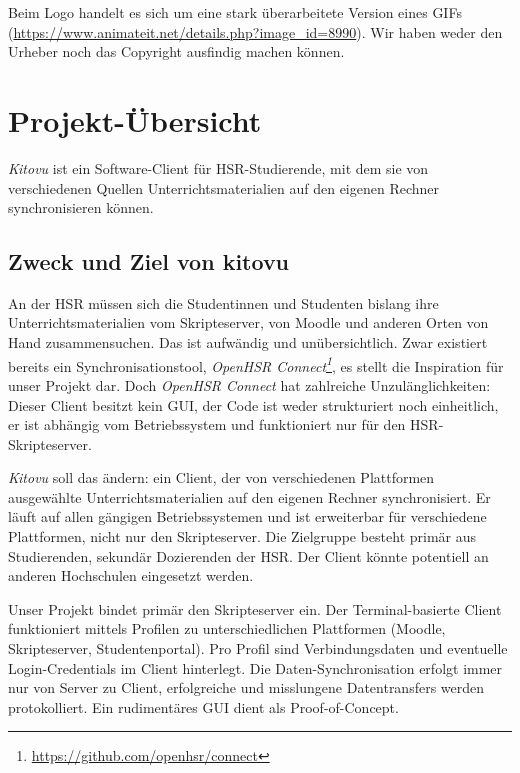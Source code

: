 \documentclass[a4paper]{article}
\let\oldsection\section
\renewcommand\section{\clearpage\oldsection}
\newcommand{\tool}[2]{\emph{#1\footnote{\url{#2}}}}
\begin{document}
Beim Logo handelt es sich um eine stark überarbeitete Version eines GIFs (\url{https://www.animateit.net/details.php?image_id=8990}). Wir haben weder den Urheber noch das Copyright ausfindig machen können.

\section{Projekt-Übersicht}
\emph{Kitovu} ist ein Software-Client für HSR-Studierende, mit dem sie von verschiedenen Quellen Unterrichtsmaterialien auf den eigenen Rechner synchronisieren können.

\subsection{Zweck und Ziel von kitovu}
An der HSR müssen sich die Studentinnen und Studenten bislang ihre Unterrichtsmaterialien vom Skripteserver, von Moodle und anderen Orten von Hand zusammensuchen. Das ist aufwändig und unübersichtlich. Zwar existiert bereits ein Synchronisationstool, \tool{OpenHSR Connect}{https://github.com/openhsr/connect}, es stellt die Inspiration für unser Projekt dar. Doch \emph{OpenHSR Connect} hat zahlreiche Unzulänglichkeiten: Dieser Client besitzt kein GUI, der Code ist weder strukturiert noch einheitlich, er ist abhängig vom Betriebssystem und funktioniert nur für den HSR-Skripteserver.

\emph{Kitovu} soll das ändern: ein Client, der von verschiedenen Plattformen ausgewählte Unterrichtsmaterialien auf den eigenen Rechner synchronisiert. Er läuft auf allen gängigen Betriebssystemen und ist erweiterbar für verschiedene Plattformen, nicht nur den Skripteserver. Die Zielgruppe besteht primär aus Studierenden, sekundär Dozierenden der HSR. Der Client könnte potentiell an anderen Hochschulen eingesetzt werden.

Unser Projekt bindet primär den Skripteserver ein. Der Terminal-basierte Client funktioniert mittels Profilen zu unterschiedlichen Plattformen (Moodle, Skripteserver, Studentenportal). Pro Profil sind Verbindungsdaten und eventuelle Login-Credentials im Client hinterlegt. Die Daten-Synchronisation erfolgt immer nur von Server zu Client, erfolgreiche und misslungene Datentransfers werden protokolliert. Ein rudimentäres GUI dient als Proof-of-Concept.
\end{document}

